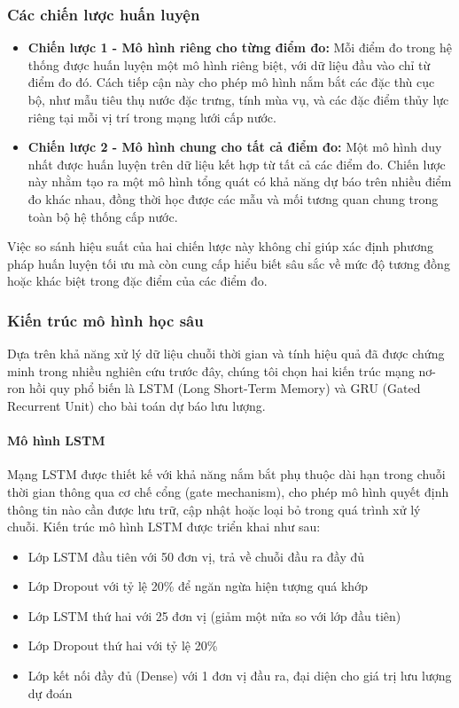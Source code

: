 \subsubsection{Các chiến lược huấn luyện}

\begin{itemize}
    \item \textbf{Chiến lược 1 - Mô hình riêng cho từng điểm đo:} Mỗi điểm đo trong hệ thống được huấn luyện một mô hình riêng biệt, với dữ liệu đầu vào chỉ từ điểm đo đó. Cách tiếp cận này cho phép mô hình nắm bắt các đặc thù cục bộ, như mẫu tiêu thụ nước đặc trưng, tính mùa vụ, và các đặc điểm thủy lực riêng tại mỗi vị trí trong mạng lưới cấp nước.
    
    \item \textbf{Chiến lược 2 - Mô hình chung cho tất cả điểm đo:} Một mô hình duy nhất được huấn luyện trên dữ liệu kết hợp từ tất cả các điểm đo. Chiến lược này nhằm tạo ra một mô hình tổng quát có khả năng dự báo trên nhiều điểm đo khác nhau, đồng thời học được các mẫu và mối tương quan chung trong toàn bộ hệ thống cấp nước.
\end{itemize}

Việc so sánh hiệu suất của hai chiến lược này không chỉ giúp xác định phương pháp huấn luyện tối ưu mà còn cung cấp hiểu biết sâu sắc về mức độ tương đồng hoặc khác biệt trong đặc điểm của các điểm đo.

\subsubsection{Kiến trúc mô hình học sâu}

Dựa trên khả năng xử lý dữ liệu chuỗi thời gian và tính hiệu quả đã được chứng minh trong nhiều nghiên cứu trước đây, chúng tôi chọn hai kiến trúc mạng nơ-ron hồi quy phổ biến là LSTM (Long Short-Term Memory) và GRU (Gated Recurrent Unit) cho bài toán dự báo lưu lượng.

\paragraph{Mô hình LSTM}
Mạng LSTM được thiết kế với khả năng nắm bắt phụ thuộc dài hạn trong chuỗi thời gian thông qua cơ chế cổng (gate mechanism), cho phép mô hình quyết định thông tin nào cần được lưu trữ, cập nhật hoặc loại bỏ trong quá trình xử lý chuỗi. Kiến trúc mô hình LSTM được triển khai như sau:

\begin{itemize}
    \item Lớp LSTM đầu tiên với 50 đơn vị, trả về chuỗi đầu ra đầy đủ
    \item Lớp Dropout với tỷ lệ 20\% để ngăn ngừa hiện tượng quá khớp
    \item Lớp LSTM thứ hai với 25 đơn vị (giảm một nửa so với lớp đầu tiên)
    \item Lớp Dropout thứ hai với tỷ lệ 20\%
    \item Lớp kết nối đầy đủ (Dense) với 1 đơn vị đầu ra, đại diện cho giá trị lưu lượng dự đoán
\end{itemize}

